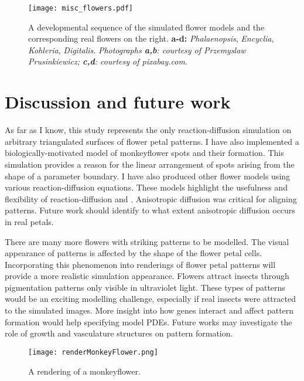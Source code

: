 \begin{figure}[ht]
	\centering
	\texttt{[image: misc\_flowers.pdf]}
	\caption{A developmental sequence of the simulated flower models and the corresponding real flowers on the right. \textbf{a-d:} \textit{Phalaenopsis}, \textit{Encyclia}, \textit{Kohleria}, \textit{Digitalis}. \textit{Photographs \textbf{a,b}: courtesy of Przemyslaw Prusinkiewicz; \textbf{c,d}: courtesy of pixabay.com}.}
	\label{fig:miscFlowers}
\end{figure}

\section{Discussion and future work}
As far as I know, this study represents the only reaction-diffusion simulation on arbitrary triangulated surfaces of flower petal patterns. I have also implemented a biologically-motivated model of monkeyflower spots and their formation. This simulation provides a reason for the linear arrangement of spots arising from the shape of a parameter boundary. I have also produced other flower models using various reaction-diffusion equations. These models highlight the usefulness and flexibility of reaction-diffusion and \ProgramName{}. Anisotropic diffusion was critical for aligning patterns. Future work should identify to what extent anisotropic diffusion occurs in real petals.

There are many more flowers with striking patterns to be modelled. The visual appearance of patterns is affected by the shape of the flower petal cells. Incorporating this phenomenon into renderings of flower petal patterns will provide a more realistic simulation appearance. Flowers attract insects through pigmentation patterns only visible in ultraviolet light. These types of patterns would be an exciting modelling challenge, especially if real insects were attracted to the simulated images. More insight into how genes interact and affect pattern formation would help specifying model PDEs. Future works may investigate the role of growth and vasculature structures on pattern formation. 

\begin{figure}[ht]
	\centering
	\texttt{[image: renderMonkeyFlower.png]}
	\caption{A rendering of a monkeyflower.}
	\label{fig:monkeyFlowerRendering}
\end{figure}